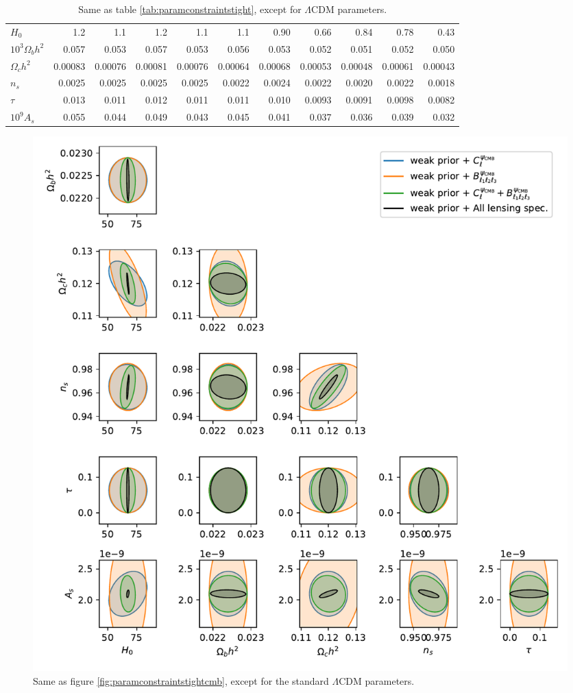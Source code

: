 \documentclass[11pt]{article} %
\begin{document}
\begin{table}[h!]
\begin{tabular}{|l|r|rrr|rrr|rrr|}
$H_0$              & 1.2   & 1.1   & 1.2   & 1.1   & 1.1   & 0.90  & 0.66  & 0.84  & 0.78  & 0.43  \\
$10^3 \Omega_b h^2$ & 0.057 & 0.053 & 0.057 & 0.053 & 0.056 & 0.053 & 0.052 & 0.051 & 0.052 & 0.050 \\
$\Omega_c h^2$     & 0.00083& 0.00076& 0.00081& 0.00076& 0.00064& 0.00068& 0.00053& 0.00048& 0.00061& 0.00043 \\
$n_s$              & 0.0025& 0.0025& 0.0025& 0.0025& 0.0022& 0.0024& 0.0022& 0.0020& 0.0022& 0.0018 \\
$\tau$             & 0.013 & 0.011 & 0.012 & 0.011 & 0.011 & 0.010 & 0.0093& 0.0091& 0.0098& 0.0082 \\
$10^9 A_s$         & 0.055 & 0.044 & 0.049 & 0.043 & 0.045 & 0.041 & 0.037 & 0.036 & 0.039 & 0.032 \\
\hline
\end{tabular}
        \caption{Same as table \ref{tab:paramconstraintstight}, except for $\Lambda$CDM parameters.}
        \label{tab:paramconstraintsall}
\end{table}

\begin{figure}[h!]
    \centering
    \includegraphics[width=\textwidth]{paper/figures/param_constraints_lcdm_cmb_weak_prior.pdf}
    \caption{Same as figure \ref{fig:paramconstraintstightcmb}, except for the standard $\Lambda$CDM parameters.}
    \label{fig:paramconstraintsallcmb}
\end{figure}
\end{document}
